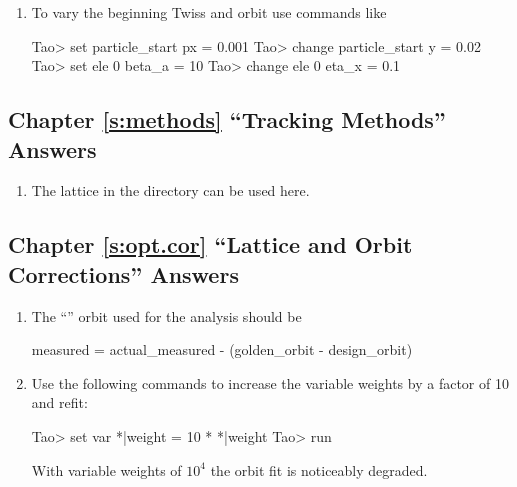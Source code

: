 \documentclass{hitec}     %
\begin{document}
\begin{enumerate}[label=\ref*{s:fork}.\arabic{enumi}]
\item
To vary the beginning Twiss and orbit use commands like
\begin{code}
Tao> set particle_start px = 0.001
Tao> change particle_start y = 0.02
Tao> set ele 0 beta_a = 10
Tao> change ele 0 eta_x = 0.1
\end{code}
\end{enumerate}

\subsection[Chapter \ref*{s:methods.ex} ``Tracking Methods'']{Chapter \hyperref[s:methods.ex]{\ref*{s:methods}} ``Tracking Methods'' Answers}
\label{s:ans.methods}

\begin{enumerate}[label=\ref*{s:methods}.\arabic{enumi}]
\item
The  lattice in the  directory can be used here.
\end{enumerate}

%

\subsection[Chapter \ref*{s:opt.corr.ex} ``Lattice Correction'']{Chapter \hyperref[s:opt.corr.ex]{\ref*{s:opt.cor}} ``Lattice and Orbit Corrections'' Answers}
\label{s:ans.corr}

\begin{enumerate}[label=\ref*{s:opt.cor}.\arabic{enumi}]
\item
The ``'' orbit used for the analysis should be
\begin{code}
  measured = actual_measured - (golden_orbit - design_orbit)
\end{code}
%
\item
Use the following commands to increase the variable weights by a factor of 10 and refit:
\begin{code}
Tao> set var *|weight = 10 * *|weight
Tao> run
\end{code}
With variable weights of $10^4$ the orbit fit is noticeably degraded.
\end{enumerate}
\end{document}

